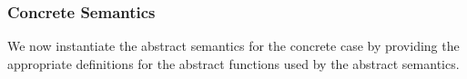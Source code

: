\subsubsection{Concrete Semantics}
We now instantiate the abstract semantics for the concrete case by providing the appropriate definitions 
for the abstract functions used by the abstract semantics. 









%






